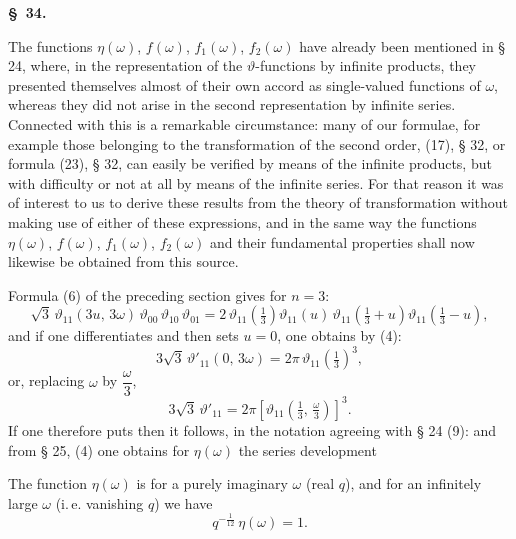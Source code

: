 
\begin{center}
\textbf{\S\ 34. }
\end{center}

The functions $\eta(\omega)$, $f(\omega)$, $f_1(\omega)$, $f_2(\omega)$ have already
been mentioned in § 24, where, in the representation of the $\vartheta$-functions by
infinite products, they presented themselves almost of their own accord as
single-valued functions of $\omega$, whereas they did not arise in the second
representation by infinite series. Connected with this is a remarkable circumstance:
many of our formulae, for example those belonging to the transformation of the second
order, (17), § 32, or formula (23), § 32, can easily be verified by means of the
infinite products, but with difficulty or not at all by means of the infinite series.
For that reason it was of interest to us to derive these results from the theory of
transformation without making use of either of these expressions, and in the same way
the functions $\eta(\omega)$, $f(\omega)$, $f_1(\omega)$, $f_2(\omega)$ and their
fundamental properties shall now likewise be obtained from this source.

Formula (6) of the preceding section gives for $n=3$:
\[
\sqrt{3}\,\vartheta_{11}(3u,\,3\omega)\,\vartheta_{00}\,\vartheta_{10}\,\vartheta_{01}
= 2\,\vartheta_{11}\!\left(\tfrac{1}{3}\right)\vartheta_{11}(u)\,
\vartheta_{11}\!\left(\tfrac{1}{3}+u\right)\vartheta_{11}\!\left(\tfrac{1}{3}-u\right),
\]
and if one differentiates and then sets $u=0$, one obtains by (4):
\[
3\sqrt{3}\,\vartheta'_{11}(0,\,3\omega) = 2\pi\,\vartheta_{11}\!\left(\tfrac{1}{3}\right)^3,
\]
or, replacing $\omega$ by $\dfrac{\omega}{3}$,
\[
3\sqrt{3}\,\vartheta'_{11} = 2\pi\left[\vartheta_{11}\!\left(\tfrac{1}{3},\,\tfrac{\omega}{3}\right)\right]^3.
\]
If one therefore puts
then it follows, in the notation agreeing with § 24 (9):
and from § 25, (4) one obtains for $\eta(\omega)$ the series development

The function $\eta(\omega)$ is  for a purely imaginary $\omega$ (real $q$), and for
an infinitely large $\omega$ (i.\,e. vanishing $q$) we have
\[
q^{-\frac{1}{12}}\,\eta(\omega) = 1.
\]
